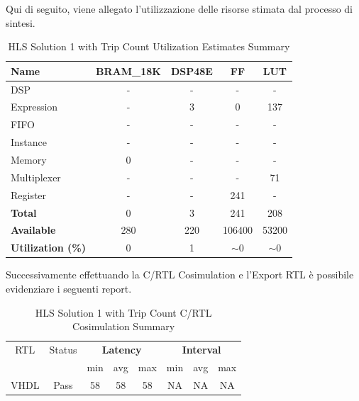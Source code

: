 Qui di seguito, viene allegato l'utilizzazione delle risorse stimata dal processo di sintesi.
\begin{table}[H]
	\centering
	\begin{tabular}{|l|c|c|c|c|}
		\hline
		\textbf{Name}    & \textbf{BRAM\_18K} & \textbf{DSP48E} & \textbf{FF} & \textbf{LUT} \\ \hline
		DSP              & -                   & -               & -           & -            \\ 
		Expression       & -                   & 3               & 0           & 137          \\ 
		FIFO             & -                   & -               & -           & -            \\ 
		Instance         & -                   & -               & -           & -            \\ 
		Memory           & 0                   & -               & -          & -            \\ 
		Multiplexer      & -                   & -               & -           & 71          \\ 
		Register         & -                   & -               & 241         & -            \\ \hline
		\textbf{Total}   & 0                   & 3               & 241         & 208          \\ \hline
		\textbf{Available} & 280               & 220             & 106400      & 53200        \\ \hline
		\textbf{Utilization (\%)} & 0            & 1               & $\sim$0     & $\sim$0      \\ \hline
	\end{tabular}
	\caption{HLS Solution 1 with Trip Count Utilization Estimates Summary}
	\label{tab:hls-solution-1-utilization-estimates-summary}
\end{table}

Successivamente effettuando la C/RTL Cosimulation e l'Export RTL è possibile evidenziare i seguenti report.
\begin{table}[H]
	\centering
	\begin{tabular}{|c|c|c|c|c|c|c|c|}
		\hline
		\multicolumn{1}{|c|}{RTL} & \multicolumn{1}{|c|}{Status} & \multicolumn{3}{c|}{\textbf{Latency}} & \multicolumn{3}{c|}{\textbf{Interval}} \\
		&  & min & avg & max & min & avg & max \\
		\hline
		VHDL & Pass & 58 & 58 & 58 & NA & NA & NA \\
		\hline
	\end{tabular}
	\caption{HLS Solution 1 with Trip Count C/RTL Cosimulation Summary }
	\label{tab:hls-solution-1-cosimulation-summary}
\end{table}

